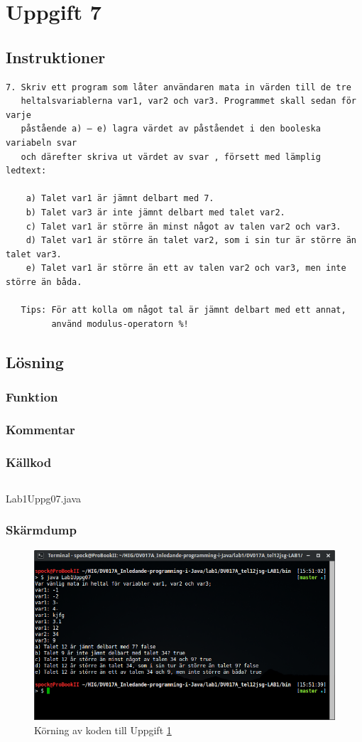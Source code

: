 \section{Uppgift 7}\label{uppgift-7}

\subsection{Instruktioner}
\begin{verbatim}
7. Skriv ett program som låter användaren mata in värden till de tre
   heltalsvariablerna var1, var2 och var3. Programmet skall sedan för varje
   påstående a) – e) lagra värdet av påståendet i den booleska variabeln svar
   och därefter skriva ut värdet av svar , försett med lämplig ledtext:

    a) Talet var1 är jämnt delbart med 7.
    b) Talet var3 är inte jämnt delbart med talet var2.
    c) Talet var1 är större än minst något av talen var2 och var3.
    d) Talet var1 är större än talet var2, som i sin tur är större än talet var3.
    e) Talet var1 är större än ett av talen var2 och var3, men inte större än båda.

   Tips: För att kolla om något tal är jämnt delbart med ett annat,
         använd modulus-operatorn %!
\end{verbatim}


\subsection{Lösning}
\subsubsection{Funktion}
\subsubsection{Kommentar}

\subsubsection{Källkod}\label{uppgift-7_src}
    \inputminted[linenos]{java}{src/Lab1Uppg07.java}
    \caption{Lab1Uppg07.java}
    \label{Uppg7src}

\subsubsection{Skärmdump}
\begin{figure}[htbp]
    \centering
        \includegraphics[width=\linewidth]{img/07.png}
    \caption{Körning av koden till Uppgift \ref{uppgift-7}}
    \label{fig:screenshot-07}
\end{figure}
